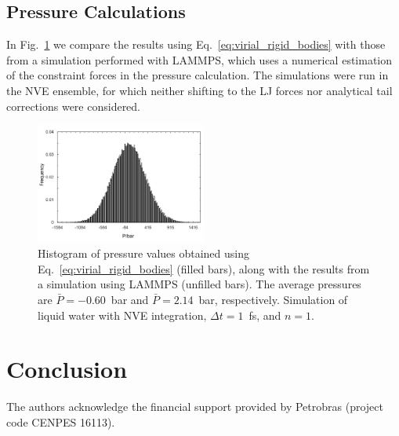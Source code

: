 \documentclass[aip,jcp,reprint,amsmath,amssymb,raggedbottom]{revtex4-1}
\begin{document}
\subsection{Pressure Calculations}

In Fig.~\ref{fig:pressure} we compare the results using Eq.~\ref{eq:virial_rigid_bodies} with those from a simulation performed with LAMMPS, which uses a numerical estimation of the constraint forces in the pressure calculation. The simulations were run in the NVE ensemble, for which neither shifting to the LJ forces nor analytical tail corrections were considered. 


\begin{figure}
	\includegraphics[width=0.5\textwidth,keepaspectratio]{FiguraAna}
	\caption{Histogram of pressure values obtained using Eq.~\ref{eq:virial_rigid_bodies} (filled bars), along with the results from a simulation using LAMMPS (unfilled bars). The average pressures are $\bar{P} = -0.60$~bar and $\bar{P} = 2.14$~bar, respectively. Simulation of liquid water with NVE integration, $\Delta t = 1$~fs, and $n = 1$.}
	\label{fig:pressure}
\end{figure}

\section{Conclusion}

\begin{acknowledgments}
The authors acknowledge the financial support provided by Petrobras (project code CENPES 16113).
\end{acknowledgments}

\appendix
\end{document}
